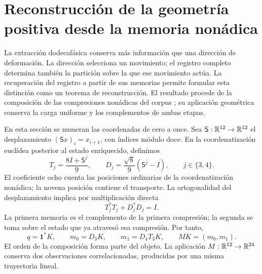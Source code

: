 \section{Reconstrucción de la geometría positiva desde la memoria nonádica}
\label{sec:memory}

La extracción dodecafásica conserva más información que una dirección de
deformación. La dirección selecciona un movimiento; el registro completo
determina también la partición sobre la que ese movimiento actúa. La
recuperación del registro a partir de sus memorias permite formular esta
distinción como un teorema de reconstrucción. El resultado procede de la
composición de las compresiones nonádicas del corpus \cite{hmtX}; su aplicación
geométrica conserva la carga uniforme y los complementos de ambas etapas.

En esta sección se numeran las coordenadas de cero a once. Sea
\(\mathsf S:\mathbb R^{12}\to\mathbb R^{12}\) el desplazamiento
\((\mathsf Sx)_i=x_{i+1}\), con índices módulo doce. En la coordenatización euclídea
posterior al estado enriquecido, definimos
\[
 T_j=\frac{8I+\mathsf S^j}{9},\qquad
 D_j=\frac{\sqrt8}{9}(\mathsf S^j-I),\qquad j\in\{3,4\}.
\]
El coeficiente ocho cuenta las posiciones ordinarias de la coordenatización nonádica;
la novena posición contiene el transporte. La ortogonalidad del desplazamiento
implica por multiplicación directa
\[
 T_j^*T_j+D_j^*D_j=I.
\]
La primera memoria es el complemento de la primera compresión; la segunda
se toma sobre el estado que ya atravesó esa compresión. Por tanto,
\begin{equation}
 q=\mathbf1^*K,\qquad m_0=D_3K,\qquad m_1=D_4T_3K,
 \qquad MK=(m_0,m_1).
 \label{eq:mem-data}
\end{equation}
El orden de la composición forma parte del objeto. La aplicación
\(M:\mathbb R^{12}\to\mathbb R^{24}\) conserva dos observaciones correlacionadas,
producidas por una misma trayectoria lineal.

